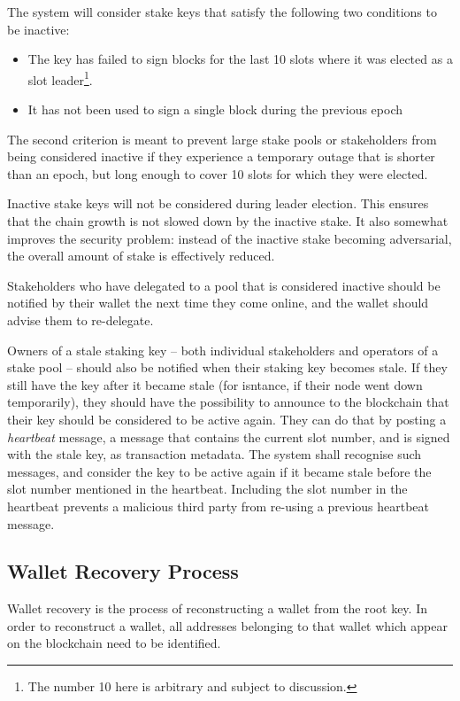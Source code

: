\documentclass[11pt,a4paper]{article}
\begin{document}
The system will consider stake keys that satisfy the following two
conditions to be inactive:

\begin{itemize}
\item
  The key has failed to sign blocks for the last 10 slots where it was
  elected as a slot leader\footnote{The number 10 here is arbitrary and
    subject to discussion.}.
\item
  It has not been used to sign a single block during the previous epoch
\end{itemize}

The second criterion is meant to prevent large stake pools or
stakeholders from being considered inactive if they experience a
temporary outage that is shorter than an epoch, but long enough to cover
10 slots for which they were elected.

Inactive stake keys will not be considered during leader election. This
ensures that the chain growth is not slowed down by the inactive stake.
It also somewhat improves the security problem: instead of the inactive
stake becoming adversarial, the overall amount of stake is effectively
reduced.

Stakeholders who have delegated to a pool that is considered inactive
should be notified by their wallet the next time they come online, and
the wallet should advise them to re-delegate.

Owners of a stale staking key -- both individual stakeholders and
operators of a stake pool -- should also be notified when their staking
key becomes stale. If they still have the key after it became stale (for
isntance, if their node went down temporarily), they should have the
possibility to announce to the blockchain that their key should be
considered to be active again. They can do that by posting a
\emph{heartbeat} message, a message that contains the current slot
number, and is signed with the stale key, as transaction metadata. The
system shall recognise such messages, and consider the key to be active
again if it became stale before the slot number mentioned in the
heartbeat. Including the slot number in the heartbeat prevents a
malicious third party from re-using a previous heartbeat message.

\subsection{Wallet Recovery Process}
\label{wallet-recovery-process}

Wallet recovery is the process of reconstructing a wallet from the root
key. In order to reconstruct a wallet, all addresses belonging to that
wallet which appear on the blockchain need to be identified.
\end{document}
